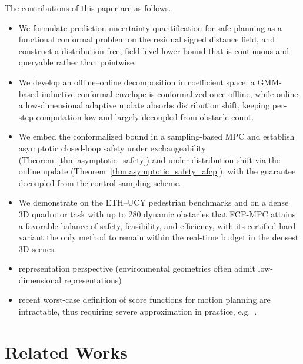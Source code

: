 \documentclass[lettersize,journal]{IEEEtran}
\begin{document}
The contributions of this paper are as follows.
\begin{itemize}
    \item We formulate prediction-uncertainty quantification for safe planning as a functional conformal problem on the residual signed distance field, and construct a distribution-free, field-level lower bound that is continuous and queryable rather than pointwise.

    \item We develop an offline–online decomposition in coefficient space: a GMM-based inductive conformal envelope is conformalized once offline, while online a low-dimensional adaptive update absorbs distribution shift, keeping per-step computation low and largely decoupled from obstacle count.

    \item We embed the conformalized bound in a sampling-based MPC and establish asymptotic closed-loop safety under exchangeability (Theorem~\ref{thm:asymptotic_safety}) and under distribution shift via the online update (Theorem~\ref{thm:asymptotic_safety_afcp}), with the guarantee decoupled from the control-sampling scheme.

    \item We demonstrate on the ETH–UCY pedestrian benchmarks and on a dense 3D quadrotor task with up to 280 dynamic obstacles that FCP-MPC attains a favorable balance of safety, feasibility, and efficiency, with its certified hard variant the only method to remain within the real-time budget in the densest 3D scenes.
\end{itemize}



\begin{itemize}
    \item representation perspective (environmental geometries often admit low-dimensional representations)

    \item recent worst-case definition of score functions for motion planning are intractable, thus requiring severe approximation in practice, e.g.~\cite{mei2025perceive,sundarsingh2026safe}.
\end{itemize}



\section{Related Works}
\end{document}

